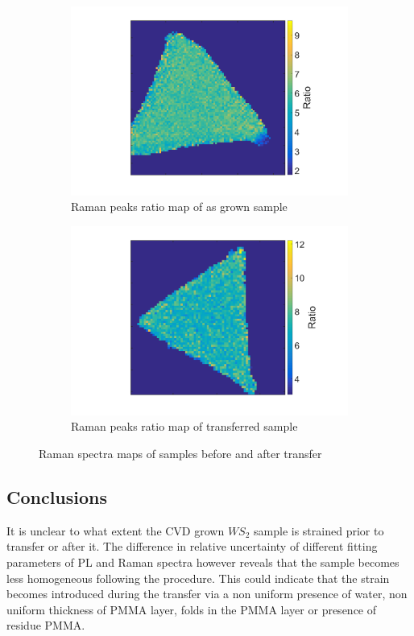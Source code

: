 \begin{figure}[ht]
\begin{center}
\begin{subfigure}[b]{0.4\textwidth}
			\includegraphics[scale=0.15]{Transfer/TransferRamanRatioMapAsgrown.png}
			\caption{Raman peaks ratio map of as grown sample}
			\label{fig:TransferRamanRatioAMapAsgrown}
		\end{subfigure}
		\quad
		\begin{subfigure}[b]{0.4\textwidth}
			\includegraphics[scale=0.15]{Transfer/TransferRamanRatioMapTransferred.png}
			\caption{Raman peaks ratio map of transferred sample}
			\label{fig:TransferRamanRatioAMapTransferred}
		\end{subfigure}
		\caption{Raman spectra maps of samples before and after transfer}
		\label{fig:TransferRamanDiffRatioMapsComparison}
	\end{center}
\end{figure}
	
	\subsection{Conclusions}
	
	It is unclear to what extent the CVD grown $WS_2$ sample is strained prior to transfer or after it. The difference in relative uncertainty of different fitting parameters of PL and Raman spectra however reveals that the sample becomes less homogeneous following the procedure. This could indicate that the strain becomes introduced during the transfer via a non uniform presence of water, non uniform thickness of PMMA layer, folds in the PMMA layer or presence of residue PMMA. 